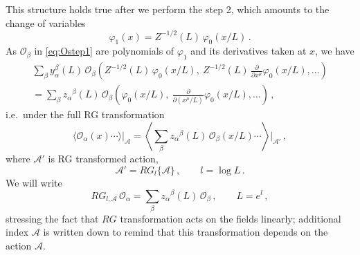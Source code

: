 This structure holds true after we perform the step 2, which amounts to the change
of variables
\[
\varphi_1(x)=Z^{-1/2}(L)\,\varphi_0(x/L)\,.
\]
As $\mathcal O_\beta$ in \eqref{eq:Ostep1} are polynomials of $\varphi_1$ and its
derivatives taken at $x$, we have
\begin{multline*}
\sum_\beta y_\alpha^\beta(L)\,\mathcal O_\beta\left(Z^{-1/2}(L)\,\varphi_0(x/L),\ Z^{-1/2}(L)\,\frac\partial{\partial x^\mu}\varphi_0(x/L),\dots\right)\\
=\sum_\beta z_\alpha{}^\beta(L)\,\mathcal O_\beta\left(\varphi_0(x/L),\ \frac\partial{\partial(x^\mu/L)}\varphi_0(x/L),\dots\right)\,,
\end{multline*}
i.e.\ under the full RG transformation
\begin{equation}\label{eq:RGfields}
\bigl\langle\mathcal O_\alpha(x)\cdots\bigr\rangle\big|_{\mathcal A}=\left\langle\sum_\beta z_\alpha{}^\beta(L)\,\mathcal O_\beta(x/L)\cdots\right\rangle\Big|_{\mathcal A'}\,,
\end{equation}
where $\mathcal A'$ is RG transformed action,
\[
\mathcal A'=RG_l\{\mathcal A\}\,,\qquad l=\log L\,.
\]
We will write
\begin{equation}\label{eq:RGop}
RG_{l,\mathcal A}\,\mathcal O_\alpha=\sum_\beta z_\alpha{}^\beta(L)\,\mathcal O_\beta\,,\qquad L=e^l\,,
\end{equation}
stressing the fact that $RG$ transformation acts on the fields linearly;
additional index $\mathcal A$ is written down to remind that this transformation
depends on the action $\mathcal A$.

